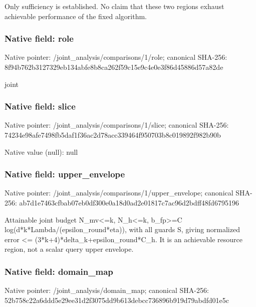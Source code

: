 \documentclass[10pt,a4paper]{article}
\begin{document}
\begingroup\raggedright\sloppy Only sufficiency is established. No claim that these two regions exhaust achievable performance of the fixed algorithm.\par\endgroup

\subsubsection{Native field: role}
Native pointer: /joint\_\allowbreak{}analysis/comparisons/1/role; canonical SHA-256: 8f94b762b3127329eb134abfe8b8ca262f59c15e9c4e0e3f86d45886d57a82de

\begingroup\raggedright\sloppy joint\par\endgroup

\subsubsection{Native field: slice}
Native pointer: /joint\_\allowbreak{}analysis/comparisons/1/slice; canonical SHA-256: 74234e98afe7498fb5daf1f36ac2d78acc339464f950703b8c019892f982b90b

Native value (null): null

\subsubsection{Native field: upper\_\allowbreak{}envelope}
Native pointer: /joint\_\allowbreak{}analysis/comparisons/1/upper\_\allowbreak{}envelope; canonical SHA-256: ab7d1e7463cfbab07eb0df300e0a18d0ad2e01817c7ac96d2bdff48fd6795196

\begingroup\raggedright\sloppy Attainable joint budget N\_\allowbreak{}mv<=\allowbreak{}k,\allowbreak{} N\_\allowbreak{}h<=\allowbreak{}k,\allowbreak{} b\_\allowbreak{}fp>=\allowbreak{}C log(d*k*Lambda/\allowbreak{}(epsilon\_\allowbreak{}round*eta)),\allowbreak{} with all guards S,\allowbreak{} giving normalized error <=\allowbreak{} (3*k+4)*delta\_\allowbreak{}k+epsilon\_\allowbreak{}round*C\_\allowbreak{}h. It is an achievable resource region,\allowbreak{} not a scalar query upper envelope.\par\endgroup

\subsubsection{Native field: domain\_\allowbreak{}map}
Native pointer: /joint\_\allowbreak{}analysis/domain\_\allowbreak{}map; canonical SHA-256: 52b758c22a6ddd5e29ee31d2f3075dd9b613debcc736896b919d79abdfd01e5c
\end{document}
